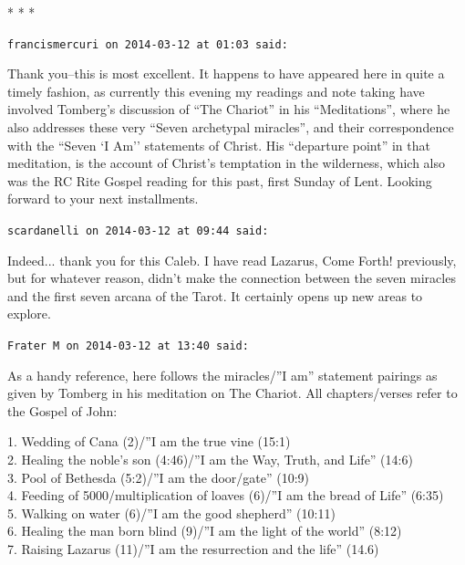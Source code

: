 
\begin{center}* * *\end{center}

\begin{footnotesize}
\begin{sffamily}
\texttt{francismercuri on 2014-03-12 at 01:03 said:}

Thank you--this is most excellent. It happens to have appeared here in quite a timely fashion, as currently this evening my readings and note taking have involved Tomberg's discussion of ``The Chariot'' in his ``Meditations'', where he also addresses these very ``Seven archetypal miracles'', and their correspondence with the ``Seven `I Am'' statements of Christ. His ``departure point'' in that meditation, is the account of Christ's temptation in the wilderness, which also was the RC Rite Gospel reading for this past, first Sunday of Lent. Looking forward to your next installments.

\hfill

\texttt{scardanelli on 2014-03-12 at 09:44 said:}

Indeed... thank you for this Caleb. I have read Lazarus, Come Forth! previously, but for whatever reason, didn't make the connection between the seven miracles and the first seven arcana of the Tarot. It certainly opens up new areas to explore.

\hfill

\texttt{Frater M on 2014-03-12 at 13:40 said:}

As a handy reference, here follows the miracles/''I am'' statement pairings as given by Tomberg in his meditation on The Chariot. All chapters/verses refer to the Gospel of John:

1. Wedding of Cana (2)/''I am the true vine (15:1)\\ 2. Healing the noble's son (4:46)/''I am the Way, Truth, and Life'' (14:6)\\ 3. Pool of Bethesda (5:2)/''I am the door/gate'' (10:9)\\ 4. Feeding of 5000/multiplication of loaves (6)/''I am the bread of Life'' (6:35)\\ 5. Walking on water (6)/''I am the good shepherd'' (10:11)\\ 6. Healing the man born blind (9)/''I am the light of the world'' (8:12)\\ 7. Raising Lazarus (11)/''I am the resurrection and the life'' (14.6)


\end{sffamily}
\end{footnotesize}
